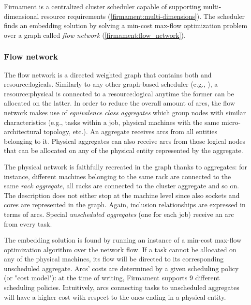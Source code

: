Firmament \cite{firmament} is a centralized cluster scheduler capable of supporting multi\hyp{}dimensional resource requirements (\autoref{firmament:multi-dimensions}).
The scheduler finds an embedding solution by solving a min-cost max-flow optimization problem over a graph called \textit{flow network} (\autoref{firmament:flow_network}).

\subsubsection{Flow network} \label{firmament:flow_network}
The flow network is a directed weighted graph that contains both  and \glspl{resource:logical}.
Similarly to any other graph-based scheduler (e.g., \cite{ontackling}), a \gls{resource:physical} is connected to a \gls{resource:logical} anytime the former can be allocated on the latter.
In order to reduce the overall amount of arcs, the flow network makes use of \textit{equivalence class aggregates} which group nodes with similar characteristics (e.g., tasks within a job, physical machines with the same micro-architectural topology, etc.).
An aggregate receives arcs from all entities belonging to it.
Physical aggregates can also receive arcs from those logical nodes that can be allocated on any of the physical entity represented by the aggregate.\par
The physical network is faithfully recreated in the graph thanks to aggregates: for instance, different machines belonging to the same rack are connected to the same \textit{rack aggregate}, all racks are connected to the cluster aggregate and so on.
The description does not either stop at the machine level since also sockets and cores are represented in the graph.
Again, inclusion relationships are expressed in terms of arcs.
Special \textit{unscheduled aggregates} (one for each job) receive an arc from every task.\par
The embedding solution is found by running an instance of a min-cost max-flow optimization algorithm over the network flow.
If a task cannot be allocated on any of the physical machines, its flow will be directed to its corresponding unscheduled aggregate.
Arcs' costs are determined by a given scheduling policy (or "cost model"): at the time of writing, Firmament \cite{firmament} supports 9 different scheduling policies.
Intuitively, arcs connecting tasks to unscheduled aggregates will have a higher cost with respect to the ones ending in a physical entity.

